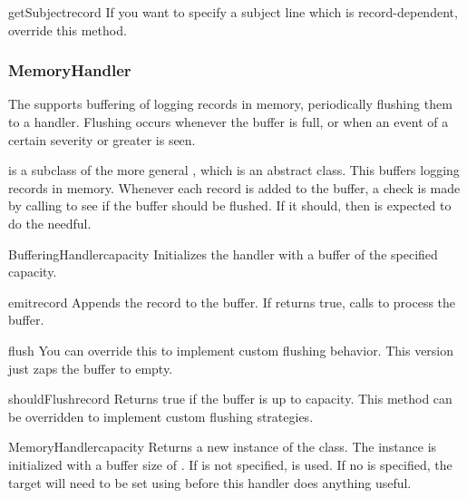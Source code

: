 \begin{methoddesc}{getSubject}{record}
If you want to specify a subject line which is record-dependent,
override this method.
\end{methoddesc}

\subsubsection{MemoryHandler}

The  supports buffering of logging records in memory,
periodically flushing them to a  handler. Flushing occurs
whenever the buffer is full, or when an event of a certain severity or
greater is seen.

 is a subclass of the more general
, which is an abstract class. This buffers logging
records in memory. Whenever each record is added to the buffer, a
check is made by calling  to see if the buffer
should be flushed.  If it should, then  is expected to
do the needful.

\begin{classdesc}{BufferingHandler}{capacity}
Initializes the handler with a buffer of the specified capacity.
\end{classdesc}

\begin{methoddesc}{emit}{record}
Appends the record to the buffer. If  returns true,
calls  to process the buffer.
\end{methoddesc}

\begin{methoddesc}{flush}{}
You can override this to implement custom flushing behavior. This version
just zaps the buffer to empty.
\end{methoddesc}

\begin{methoddesc}{shouldFlush}{record}
Returns true if the buffer is up to capacity. This method can be
overridden to implement custom flushing strategies.
\end{methoddesc}

\begin{classdesc}{MemoryHandler}{capacity}
Returns a new instance of the  class. The
instance is initialized with a buffer size of . If
 is not specified,  is used. If no
 is specified, the target will need to be set using
 before this handler does anything useful.
\end{classdesc}

